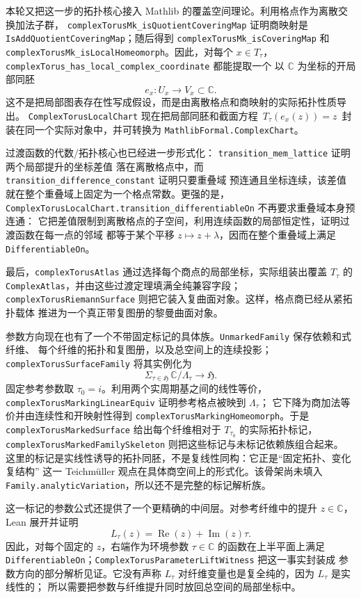\documentclass[UTF8,fontset=none,a4paper,11pt]{ctexart}
\begin{document}
本轮又把这一步的拓扑核心接入 Mathlib 的覆盖空间理论。利用格点作为离散交换加法子群，
\texttt{complexTorusMk\_isQuotientCoveringMap} 证明商映射是
\texttt{IsAddQuotientCoveringMap}；随后得到
\texttt{complexTorusMk\_isCoveringMap} 和
\texttt{complexTorusMk\_isLocalHomeomorph}。因此，对每个
$x\in T_\tau$，\texttt{complexTorus\_has\_local\_complex\_coordinate} 都能提取一个
以 $\mathbb C$ 为坐标的开局部同胚
\[
  e_x:U_x\longrightarrow V_x\subset\mathbb C.
\]
这不是把局部图表存在性写成假设，而是由离散格点和商映射的实际拓扑性质导出。
\texttt{ComplexTorusLocalChart} 现在把局部同胚和截面方程
\(\,T_\tau(e_x(z))=z\,\) 封装在同一个实际对象中，并可转换为
\texttt{MathlibFormal.ComplexChart}。

过渡函数的代数/拓扑核心也已经进一步形式化：
\texttt{transition\_mem\_lattice} 证明两个局部提升的坐标差值
落在离散格点中，而 \texttt{transition\_difference\_constant} 证明只要重叠域
预连通且坐标连续，该差值就在整个重叠域上固定为一个格点常数。更强的是，
\texttt{ComplexTorusLocalChart.transition\_differentiableOn} 不再要求重叠域本身预连通：
它把差值限制到离散格点的子空间，利用连续函数的局部恒定性，证明过渡函数在每一点的邻域
都等于某个平移 \(z\mapsto z+\lambda\)，因而在整个重叠域上满足
\texttt{DifferentiableOn}。

最后，\texttt{complexTorusAtlas} 通过选择每个商点的局部坐标，实际组装出覆盖
\(T_\tau\) 的 \texttt{ComplexAtlas}，并由这些过渡定理填满全纯兼容字段；
\texttt{complexTorusRiemannSurface} 则把它装入复曲面对象。这样，格点商已经从紧拓扑载体
推进为一个真正带复图册的黎曼曲面对象。

参数方向现在也有了一个不带固定标记的具体族。\texttt{UnmarkedFamily} 保存依赖和式纤维、
每个纤维的拓扑和复图册，以及总空间上的连续投影；\texttt{complexTorusSurfaceFamily}
将其实例化为
\[
  \Sigma_{\tau\in\mathfrak H}\,\mathbb C/\Lambda_\tau\longrightarrow\mathfrak H.
\]
固定参考参数取 \(\tau_0=i\)。利用两个实周期基之间的线性等价，
\texttt{complexTorusMarking\allowbreak LinearEquiv} 证明参考格点被映到 \(\Lambda_\tau\)；
它下降为商加法等价并由连续性和开映射性得到
\texttt{complexTorusMarking\allowbreak Homeomorph}。于是
\texttt{complexTorusMarked\allowbreak Surface} 给出每个纤维相对于
\(T_{\tau_0}\) 的实际拓扑标记，\texttt{complexTorusMarked\allowbreak Family\allowbreak Skeleton}
则把这些标记与未标记依赖族组合起来。
这里的标记是实线性诱导的拓扑同胚，不是复线性同构：它正是“固定拓扑、变化复结构”
这一 Teichmüller 观点在具体商空间上的形式化。该骨架尚未填入
\texttt{Family.analyticVariation}，所以还不是完整的标记解析族。

这一标记的参数公式还提供了一个更精确的中间层。对参考纤维中的提升
\(z\in\mathbb C\)，Lean 展开并证明
\[
  L_\tau(z)=\operatorname{Re}(z)+\operatorname{Im}(z)\tau .
\]
因此，对每个固定的 \(z\)，右端作为环境参数 \(\tau\in\mathbb C\) 的函数在上半平面上满足
\texttt{DifferentiableOn}；\texttt{ComplexTorusParameterLiftWitness} 把这一事实封装成
参数方向的部分解析见证。它没有声称 \(L_\tau\) 对纤维变量也是复全纯的，因为 \(L_\tau\) 是实线性的；
所以需要把参数与纤维提升同时放回总空间的局部坐标中。
\end{document}
